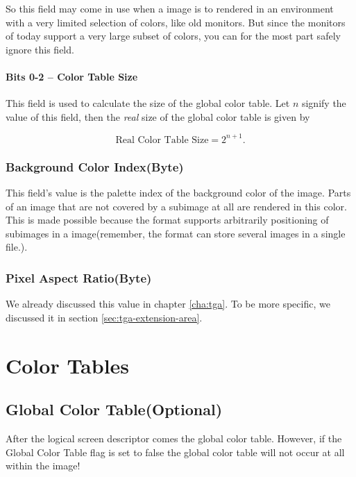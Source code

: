 So this field may come in use when a \gif image is to rendered in an
environment with a very limited selection of colors, like old
monitors.  But since the monitors of today support a very large subset
of colors, you can for the most part safely ignore this field.

\paragraph{Bits 0-2 -- Color Table Size}

This field is used to calculate the size of the global color table.
Let $n$ signify the value of this field, then the \textit{real} size
of the global color table is given by

\begin{equation}
  \label{eq:calc-global-color-table-size}
  \text{Real Color Table Size} = 2^{n + 1}.
\end{equation}

\subsubsection{Background Color Index(Byte)}

This field's value is the palette index of the background color of the
image. Parts of an image that are not covered by a subimage at all are
rendered in this color. This is made possible because the \gif format
supports arbitrarily positioning of subimages in a \gif image(remember,
the \gif format can store several images in a single file.).

\subsubsection{Pixel Aspect Ratio(Byte)}

We already discussed this value in chapter \ref{cha:tga}. To be more
specific, we discussed it in section \ref{sec:tga-extension-area}.

\section{Color Tables}

\subsection{Global Color Table(Optional)}

After the logical screen descriptor comes the global color
table. However, if the Global Color Table flag is set to false the
global color table will not occur at all within the image!

